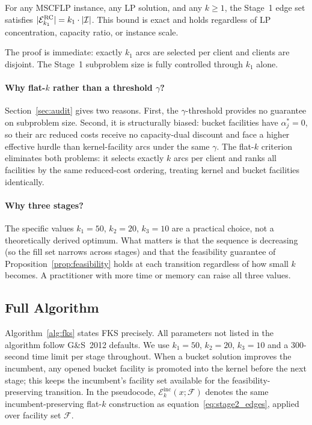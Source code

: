 \begin{proposition}
\label{prop:size}
For any MSCFLP instance, any LP solution, and any $k \geq 1$, the
Stage~1 edge set satisfies $|\mathcal{E}^{\mathrm{RC}}_{k_1}| = k_1 \cdot |\mathcal{I}|$.
This bound is exact and holds regardless of LP concentration, capacity
ratio, or instance scale.
\end{proposition}

The proof is immediate: exactly $k_1$ arcs are selected per client and
clients are disjoint.
The Stage~1 subproblem size is fully controlled through $k_1$ alone.

\paragraph{Why flat-$k$ rather than a threshold $\gamma$?}
Section~\ref{sec:audit} gives two reasons.
First, the $\gamma$-threshold provides no guarantee on subproblem size.
Second, it is structurally biased: bucket facilities have $\alpha^*_j = 0$,
so their arc reduced costs receive no capacity-dual discount and face a
higher effective hurdle than kernel-facility arcs under the same $\gamma$.
The flat-$k$ criterion eliminates both problems: it selects exactly $k$ arcs
per client and ranks all facilities by the same reduced-cost ordering,
treating kernel and bucket facilities identically.

\paragraph{Why three stages?}
The specific values $k_1=50$, $k_2=20$, $k_3=10$ are a practical choice,
not a theoretically derived optimum.
What matters is that the sequence is decreasing (so the fill set narrows
across stages) and that the feasibility guarantee of
Proposition~\ref{prop:feasibility} holds at each transition regardless of
how small $k$ becomes.
A practitioner with more time or memory can raise all three values.

\subsection{Full Algorithm}
\label{sec:full_algorithm}

Algorithm~\ref{alg:fks} states FKS precisely.
All parameters not listed in the algorithm follow G\&S~2012 defaults.
We use $k_1 = 50$, $k_2 = 20$, $k_3 = 10$ and a 300-second time limit per
stage throughout.
When a bucket solution improves the incumbent, any opened bucket facility is
promoted into the kernel before the next stage; this keeps the incumbent's
facility set available for the feasibility-preserving transition.
In the pseudocode, $\mathcal{E}^{\text{inc}}_k(x;\mathcal{F})$ denotes the
same incumbent-preserving flat-$k$ construction as
equation~\eqref{eq:stage2_edges}, applied over facility set $\mathcal{F}$.

